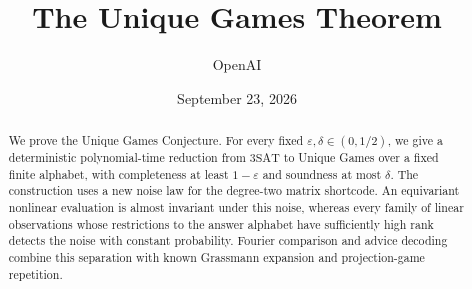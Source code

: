 \documentclass[11pt]{article}
\title{The Unique Games Theorem}
\author{OpenAI}
\date{September 23, 2026}
\theoremstyle{definition}
\theoremstyle{remark}
\numberwithin{equation}{section}
\begin{document}
\maketitle
\begin{abstract}
We prove the Unique Games Conjecture. For every fixed
\(\varepsilon,\delta\in(0,1/2)\), we give a deterministic polynomial-time
reduction from \(\mathrm{3SAT}\) to Unique Games over a fixed finite alphabet,
with completeness at least \(1-\varepsilon\) and soundness at most \(\delta\).
The construction uses a new noise law for the degree-two matrix shortcode.
An equivariant nonlinear evaluation is almost invariant under this noise,
whereas every family of linear observations whose restrictions to the
answer alphabet have sufficiently high rank detects the noise with
constant probability. Fourier comparison and advice decoding combine
this separation with known Grassmann expansion and projection-game
repetition.
\end{abstract}

\begingroup
\small
\setlength{\baselineskip}{10.5pt}
\setlength{\cftbeforesecskip}{3pt}
\tableofcontents
\endgroup
\clearpage

\FloatBarrier








\appendix



\end{document}
